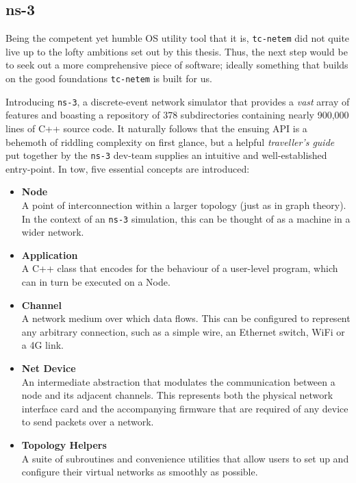 \subsection{ns-3}

Being the competent yet humble OS utility tool that it is, \texttt{tc-netem} did not quite live up to the lofty
ambitions set out by this thesis. Thus, the next step would be to seek out a more comprehensive piece of software;
ideally something that builds on the good foundations \texttt{tc-netem} is built for us.

Introducing \texttt{ns-3}, a discrete-event network simulator that provides a \emph{vast} array of
features\cite{ns_3_man} and boasting a repository of 378 subdirectories containing nearly 900,000 lines of C++ source
code\cite{ns_3_gitlab}. It naturally follows that the ensuing API is a behemoth of riddling complexity on first
glance, but a helpful \emph{traveller's guide} put together by the \texttt{ns-3} dev-team supplies an intuitive and
well-established entry-point\cite{ns_3_man_pdf}. In tow, five essential concepts are introduced:
\begin{itemize}
    \item \textbf{Node} \\
    A point of interconnection within a larger topology (just as in graph theory). In the context of an \texttt{ns-3}
    simulation, this can be thought of as a machine in a wider network.
    \item \textbf{Application} \\
    A C++ class that encodes for the behaviour of a user-level program, which can in turn be executed on a Node.
    \item \textbf{Channel} \\
    A network medium over which data flows. This can be configured to represent any arbitrary connection, such as a
    simple wire, an Ethernet switch, WiFi or a 4G link.
    \item \textbf{Net Device} \\
    An intermediate abstraction that modulates the communication between a node and its adjacent channels. This
    represents both the physical network interface card and the accompanying firmware that are required of any device
    to send packets over a network.
    \item \textbf{Topology Helpers} \\
    A suite of subroutines and convenience utilities that allow users to set up and configure their virtual networks
    as smoothly as possible.
\end{itemize}

